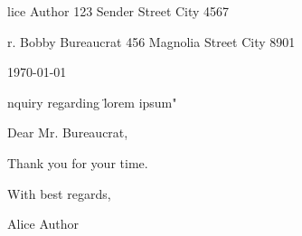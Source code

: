 \useOpTeX

\enlang \enquotes  %
\fontfam[bonum]

\hfill\address
  Alice Author
  123 Sender Street
  City 4567

\bigskip

\address
  Mr. Bobby Bureaucrat
  456 Magnolia Street
  City 8901

\hfill\today

\subject Inquiry regarding \"lorem ipsum"

Dear Mr. Bureaucrat,

\lorem[1-2] %

Thank you for your time.

With best regards,

\bigskip %
\bigskip

Alice Author

\bye

